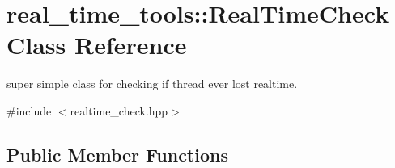 \hypertarget{classreal__time__tools_1_1RealTimeCheck}{}\section{real\+\_\+time\+\_\+tools\+:\+:Real\+Time\+Check Class Reference}
\label{classreal__time__tools_1_1RealTimeCheck}


super simple class for checking if thread ever lost realtime.  




{\ttfamily \#include $<$realtime\+\_\+check.\+hpp$>$}

\subsection*{Public Member Functions}
